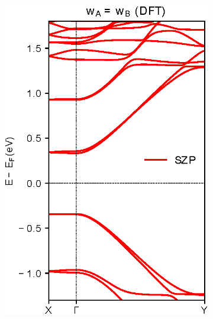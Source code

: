 \begin{figure}[h]
	\centering
	\begin{subfigure}[b]{0.3\textwidth}
		\centering
		\includegraphics[width=\textwidth]{Figures/MS2OHDFT.eps}
		\vspace{-1.5\baselineskip}
		\caption{}
		\label{MS2OHDFT}
	\end{subfigure}
	\hspace{5pt}
	\begin{subfigure}[b]{0.3\textwidth}
		\centering

\end{subfigure}
\end{figure}

